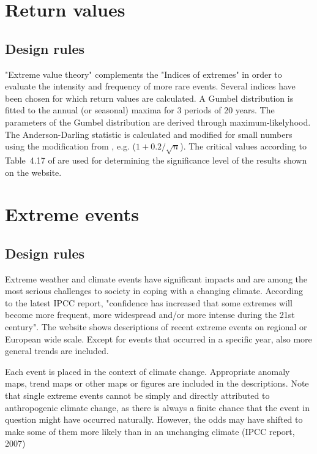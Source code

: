\documentclass[a4paper,11pt]{article}
\begin{document}
\section{Return values}
\label{sec:returnvalues}
\subsection{Design rules}
\label{sec:returnvaluesrules}

"Extreme value theory" complements the "Indices of extremes" in order
to evaluate the intensity and frequency of more rare events. Several
indices have been chosen for which return values are calculated. A
Gumbel distribution is fitted to the annual (or seasonal) maxima for 3
periods of 20 years. The parameters of the Gumbel distribution are
derived through maximum-likelyhood. The Anderson-Darling statistic is
calculated and modified for small numbers using the modification from
\citet{stephens:86}, e.g. ($1 + 0.2/\sqrt{n}$). The critical values
according to Table~4.17 of \citet{stephens:86} are used for determining
the significance level of the results shown on the website.




\section{Extreme events}
\label{sec:events}
\subsection{Design rules}
\label{sec:eventsrules}

Extreme weather and climate events have significant impacts and are
among the most serious challenges to society in coping with a changing
climate. According to the latest IPCC report, "confidence has
increased that some extremes will become more frequent, more
widespread and/or more intense during the 21st century". The website
shows descriptions of recent extreme events on regional or European
wide scale. Except for events that occurred in a specific year, also more
general trends are included. 

Each event is placed in the context of climate change. Appropriate
anomaly maps, trend maps or other maps or figures are included in the
descriptions. Note that single extreme events cannot be simply and
directly attributed to anthropogenic climate change, as there is
always a finite chance that the event in question might have occurred
naturally. However, the odds may have shifted to make some of them
more likely than in an unchanging climate (IPCC report, 2007)
\end{document}
